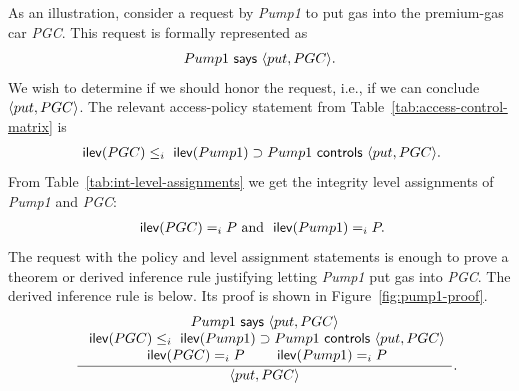As an illustration, consider a request by \emph{Pump1} to put gas into
the premium-gas car \emph{PGC}. This request is formally represented as
\begin{gather*}
  Pump1 \textsf{ says } \langle put, PGC \rangle.
\end{gather*}
We wish to determine if we should honor the request, i.e., if we can
conclude $\langle put, PGC \rangle$. The relevant access-policy statement
from Table~\ref{tab:access-control-matrix} is
\begin{gather*}
  \text{\textsf{ ilev}}(PGC) \leq_i \text{\textsf{ ilev}}(Pump1) \supset Pump1 \textsf{ controls } \langle put,
    PGC \rangle.
\end{gather*}
From Table~\ref{tab:int-level-assignments} we get the integrity level
assignments of \emph{Pump1} and \emph{PGC}:
\begin{gather*}
  \text{\textsf{ ilev}}(PGC) =_i P \text{ and } \text{\textsf{ ilev}}(Pump1) =_i P.
\end{gather*}
The request with the policy and level assignment statements is enough
to prove a theorem or derived inference rule justifying letting
\emph{Pump1} put gas into \emph{PGC}.  The derived inference rule is
below. Its proof is shown in Figure~\ref{fig:pump1-proof}.
\begin{gather*}
  \textit{}\quad {\displaystyle \frac{
    \begin{array}{c}
      Pump1 \ensuremath{\textsf{ says }}\ensuremath{\langle put, PGC \rangle}\\
      \ensuremath{\text{\textsf{ ilev}}(PGC)} \leq_i \ensuremath{\text{\textsf{ ilev}}(Pump1)} \ensuremath{\supset}Pump1 \ensuremath{\textsf{ controls }}\ensuremath{\langle put,
        PGC \rangle}\\
      \ensuremath{\text{\textsf{ ilev}}(PGC)} =_i P \qquad \ensuremath{\text{\textsf{ ilev}}(Pump1)} =_i P
    \end{array}
  }{\ensuremath{\langle put, PGC \rangle}}}.
\end{gather*}





